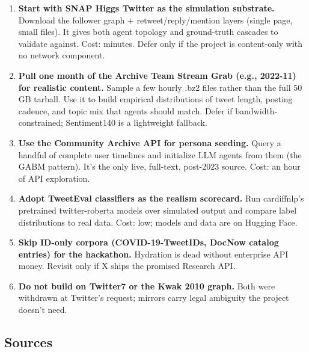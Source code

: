 \documentclass[twocolumn,10pt,letterpaper]{article}
\begin{document}
\begin{enumerate}
\setlength{\itemsep}{0pt}
\setlength{\parskip}{0pt}
  \item \textbf{Start with SNAP Higgs Twitter as the simulation substrate.} Download the follower graph + retweet/reply/mention layers (single page, small files). It gives both agent topology and ground-truth cascades to validate against. Cost: minutes. Defer only if the project is content-only with no network component.
  \item \textbf{Pull one month of the Archive Team Stream Grab (e.g., 2022-11) for realistic content.} Sample a few hourly .bz2 files rather than the full 50 GB tarball. Use it to build empirical distributions of tweet length, posting cadence, and topic mix that agents should match. Defer if bandwidth-constrained; Sentiment140 is a lightweight fallback.
  \item \textbf{Use the Community Archive API for persona seeding.} Query a handful of complete user timelines and initialize LLM agents from them (the GABM pattern). It's the only live, full-text, post-2023 source. Cost: an hour of API exploration.
  \item \textbf{Adopt TweetEval classifiers as the realism scorecard.} Run cardiffnlp's pretrained twitter-roberta models over simulated output and compare label distributions to real data. Cost: low; models and data are on Hugging Face.
  \item \textbf{Skip ID-only corpora (COVID-19-TweetIDs, DocNow catalog entries) for the hackathon.} Hydration is dead without enterprise API money. Revisit only if X ships the promised Research API.
  \item \textbf{Do not build on Twitter7 or the Kwak 2010 graph.} Both were withdrawn at Twitter's request; mirrors carry legal ambiguity the project doesn't need.
\end{enumerate}

\subsection{Sources}
\end{document}
